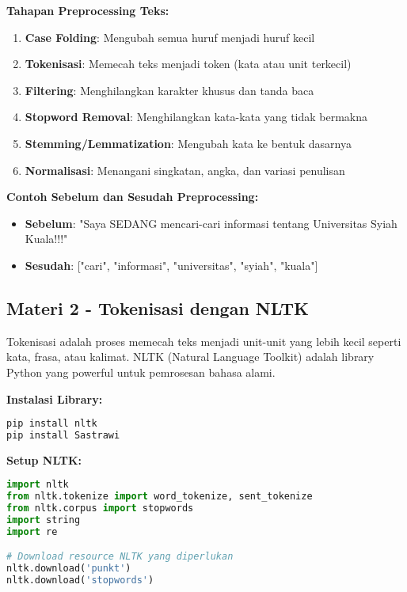 \textbf{Tahapan Preprocessing Teks:}
\begin{enumerate}
    \item \textbf{Case Folding}: Mengubah semua huruf menjadi huruf kecil
    \item \textbf{Tokenisasi}: Memecah teks menjadi token (kata atau unit terkecil)
    \item \textbf{Filtering}: Menghilangkan karakter khusus dan tanda baca
    \item \textbf{Stopword Removal}: Menghilangkan kata-kata yang tidak bermakna
    \item \textbf{Stemming/Lemmatization}: Mengubah kata ke bentuk dasarnya
    \item \textbf{Normalisasi}: Menangani singkatan, angka, dan variasi penulisan
\end{enumerate}

\textbf{Contoh Sebelum dan Sesudah Preprocessing:}
\begin{itemize}
    \item \textbf{Sebelum}: "Saya SEDANG mencari-cari informasi tentang Universitas Syiah Kuala!!!"
    \item \textbf{Sesudah}: ["cari", "informasi", "universitas", "syiah", "kuala"]
\end{itemize}

\subsection*{Materi 2 - Tokenisasi dengan NLTK}

Tokenisasi adalah proses memecah teks menjadi unit-unit yang lebih kecil seperti kata, frasa, atau kalimat. NLTK (Natural Language Toolkit) adalah library Python yang powerful untuk pemrosesan bahasa alami.

\textbf{Instalasi Library:}
\begin{lstlisting}[language=bash, style=bash]
pip install nltk
pip install Sastrawi
\end{lstlisting}

\textbf{Setup NLTK:}
\begin{lstlisting}[language=python, style=python]
import nltk
from nltk.tokenize import word_tokenize, sent_tokenize
from nltk.corpus import stopwords
import string
import re

# Download resource NLTK yang diperlukan
nltk.download('punkt')
nltk.download('stopwords')
\end{lstlisting}

